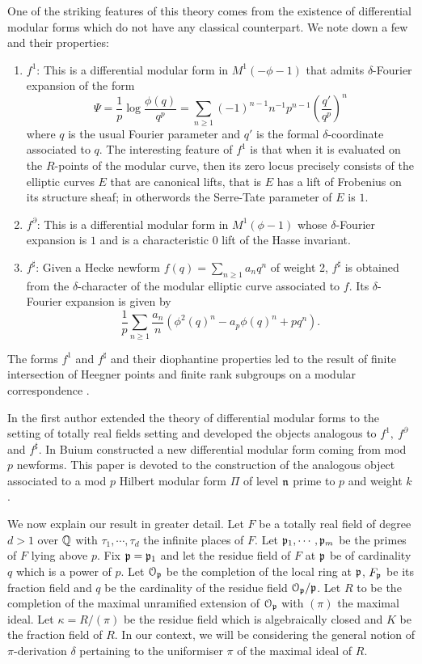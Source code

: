 \documentclass{amsart}
\newcommand{\n}{\mfrak{n}}
\numberwithin{equation}{section}
\def \d{\delta}
\begin{document}
One of the striking features of this theory comes from the existence of 
differential modular forms which do not have any classical counterpart. 
We note down a few and their properties:
\begin{enumerate}
\item {\bf $f^1$}: \cite{MR1748272} This is a differential modular form in 
$M^1(-\phi-1)$ that admits $\d$-Fourier expansion of the form
$$
\Psi= \frac{1}{p}\log \frac{\phi(q)}{q^p} =  \sum_{n \geq 1} (-1)^{n-1}n^{-1}
p^{n-1} \left(\frac{q'}{q^p}\right)^n 
$$
where $q$ is the usual Fourier parameter and $q'$ is the formal $\d$-coordinate
associated to $q$. The interesting feature of $f^1$ is that when it is 
evaluated on the $R$-points of the modular curve, then its zero locus 
precisely consists of the elliptic curves $E$ that are canonical lifts, that is 
$E$ has a lift of Frobenius on its structure sheaf; in otherwords the 
Serre-Tate parameter of $E$ is $1$.

\item {\bf $f^\partial$}: \cite{MR1988499} This is a differential modular form 
in 
$M^1(\phi-1)$ whose $\delta$-Fourier expansion is $1$ and is a characteristic
$0$ lift of the Hasse invariant.

\item {\bf $f^\sharp$}: \cite{MR2400054} 
Given a Hecke newform $f(q)=\sum_{n\geq 1} a_n q^n$ 
of weight 2, $f^\sharp$ is obtained from  
the $\d$-character of the modular elliptic curve associated to $f$. Its
$\d$-Fourier expansion is given by
$$
\frac{1}{p}\sum_{n\geq 1} \frac{a_n}{n} (\phi^2(q)^n - a_p \phi(q)^n + pq^n).
$$ 
\end{enumerate}
The forms $f^1$ and $f^\sharp$ and their diophantine properties 
led to the result of finite intersection of Heegner points
and finite rank subgroups on a modular correspondence \cite{MR2507742}.

In \cite{MR3128464} the first author extended the theory of differential
modular forms to the setting of totally real fields setting and 
developed the objects analogous to $f^1, ~f^\partial$ and $f^\sharp$. 
In \cite{MR2890522} Buium constructed a new differential modular form coming 
from 
mod $p$ newforms. This paper is devoted to the construction of
the analogous object
associated to a mod $p$ Hilbert modular form $\Pi$ of level $\n$ prime to 
$p$ and weight $k$.


We now explain our result in greater detail. 
Let $F$ be a totally real field of degree $d > 1$ over $\mathbb{Q}$
with $\tau_1,\cdots, \tau_d$ the infinite places of $F$. Let $\mathfrak{p}_1,\cdots,
\mathfrak{p}_m$ be the primes of $F$ lying above $p$. Fix $\mathfrak{p} = \mathfrak{p}_1$ and let 
the residue field of $F$ at $\mathfrak{p}$ be of cardinality $q$ which is a 
power of $p$. Let $\mathcal{O}_{\mathfrak{p}}$ be the completion of the local ring at $\mathfrak{p}$,
$F_{\mathfrak{p}}$ be its fraction field and $q$ be the cardinality of the residue
field $\mathcal{O}_{\mathfrak{p}}/\mathfrak{p}$.
Let $R$ to be the completion of the maximal
unramified extension of $\mathcal{O}_{\mathfrak{p}}$ with $(\pi)$ the maximal ideal. 
Let $\kappa= R/(\pi)$ be the residue field which is algebraically closed 
and $K$ be the fraction field
of $R$. In our context, we will be considering the general notion of 
$\pi$-derivation $\d$ pertaining to the uniformiser $\pi$ of the maximal ideal
of $R$.
\end{document}
